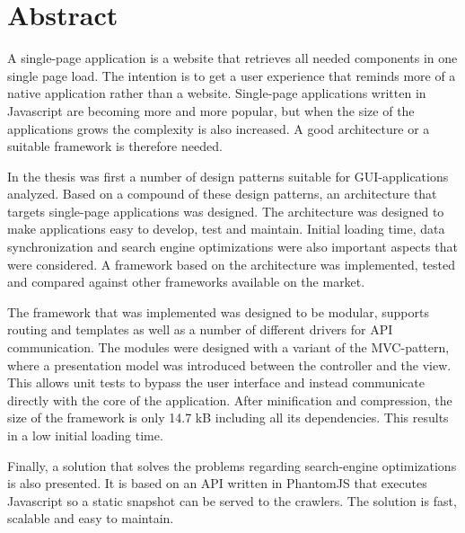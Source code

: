\chapter*{Abstract}

\thispagestyle{empty}

A single-page application is a website that retrieves all needed components in one single page load. The intention is to get a user experience that reminds more of a native application rather than a website. Single-page applications written in Javascript are becoming more and more popular, but when the size of the applications grows the complexity is also increased. A good architecture or a suitable framework is therefore needed.

In the thesis was first a number of design patterns suitable for GUI-applications analyzed. Based on a compound of these design patterns, an architecture that targets single-page applications was designed. The architecture was designed to make applications easy to develop, test and maintain. Initial loading time, data synchronization and search engine optimizations were also important aspects that were considered. A framework based on the architecture was implemented, tested and compared against other frameworks available on the market. 

The framework that was implemented was designed to be modular, supports routing and templates as well as a number of different drivers for API communication. The modules were designed with a variant of the MVC-pattern, where a presentation model was introduced between the controller and the view. This allows unit tests to bypass the user interface and instead communicate directly with the core of the application. After minification and compression, the size of the framework is only 14.7 kB including all its dependencies. This results in a low initial loading time.

Finally, a solution that solves the problems regarding search-engine optimizations is also presented. It is based on an API written in PhantomJS that executes Javascript so a static snapshot can be served to the crawlers. The solution is fast, scalable and easy to maintain.
